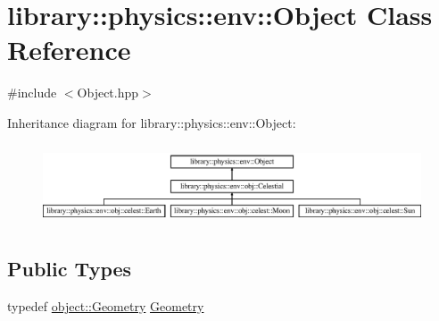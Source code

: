 \hypertarget{classlibrary_1_1physics_1_1env_1_1_object}{}\section{library\+:\+:physics\+:\+:env\+:\+:Object Class Reference}
\label{classlibrary_1_1physics_1_1env_1_1_object}


{\ttfamily \#include $<$Object.\+hpp$>$}

Inheritance diagram for library\+:\+:physics\+:\+:env\+:\+:Object\+:\begin{figure}[H]
\begin{center}
\leavevmode
\includegraphics[height=2.403433cm]{classlibrary_1_1physics_1_1env_1_1_object}
\end{center}
\end{figure}
\subsection*{Public Types}
\begin{DoxyCompactItemize}
\item 
typedef \hyperlink{classlibrary_1_1physics_1_1env_1_1object_1_1_geometry}{object\+::\+Geometry} \hyperlink{classlibrary_1_1physics_1_1env_1_1_object_abdf50733c7ad97327fb64edca5670f13}{Geometry}
\end{DoxyCompactItemize}
